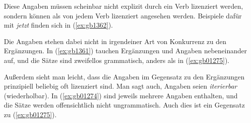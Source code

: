 \begin{exe}
  \ex\label{ex:gb1360}
  \begin{xlist}
  \end{xlist}
\end{exe}

Diese Angaben müssen scheinbar nicht explizit durch ein Verb lizenziert werden, sondern können als von jedem Verb lizenziert angesehen werden.
Beispiele dafür mit \textit{jetzt} finden sich in (\ref{ex:gb1362}).

\enlargethispage{1\baselineskip}
\begin{exe}
  \ex\label{ex:gb1362}
  \begin{xlist}
  \end{xlist}
\end{exe}

Die Angaben stehen dabei nicht in irgendeiner Art von Konkurrenz zu den Ergänzungen.
In (\ref{ex:gb1361}) tauchen Ergänzungen und Angaben nebeneinander auf, und die Sätze sind zweifellos grammatisch, anders als in (\ref{ex:gb01275}).

\begin{exe}
  \ex\label{ex:gb1361}
  \begin{xlist}
  \end{xlist}
\end{exe}

Außerdem sieht man leicht, dass die Angaben im Gegensatz zu den Ergänzungen prinzipiell beliebig oft lizenziert sind.
Man sagt auch, Angaben seien \textit{iterierbar} (wiederholbar).
%
In (\ref{ex:gb01274}) sind jeweils mehrere Angaben enthalten, und die Sätze werden offensichtlich nicht ungrammatisch.
Auch dies ist ein Gegensatz zu (\ref{ex:gb01275}).

\begin{exe}
  \ex\label{ex:gb01274}
  \begin{xlist}
  \end{xlist}
\end{exe}

